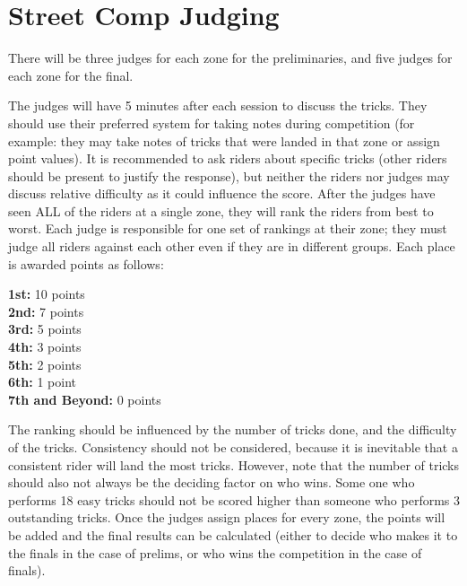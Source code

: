 \section{Street Comp Judging}
There will be three judges for each zone for the preliminaries, and five judges for each zone for the final.

The judges will have 5 minutes after each session to discuss the tricks.
They should use their preferred system for taking notes during competition (for example: they may take notes of tricks that were landed in that zone or assign point values).
It is recommended to ask riders about specific tricks (other riders should be present to justify the response), but neither the riders nor judges may discuss relative difficulty as it could influence the score.
After the judges have seen ALL of the riders at a single zone, they will rank the riders from best to worst.
Each judge is responsible for one set of rankings at their zone; they must judge all riders against each other even if they are in different groups.
Each place is awarded points as follows:

\textbf{1st:} 10 points\\
\textbf{2nd:} 7 points\\
\textbf{3rd:} 5 points\\
\textbf{4th:} 3 points\\
\textbf{5th:} 2 points\\
\textbf{6th:} 1 point\\ 
\textbf{7th and Beyond:} 0 points

The ranking should be influenced by the number of tricks done, and the difficulty of the tricks.
Consistency should not be considered, because it is inevitable that a consistent rider will land the most tricks.
However, note that the number of tricks
should also not always be the deciding factor on who wins.
Some one who performs 18 easy tricks should not be scored higher than someone who performs 3 outstanding tricks.
Once the judges assign places for every zone, the points will be added and the final results can be calculated (either to decide who makes it to the finals in the case of prelims, or who wins the competition in the case of finals).

